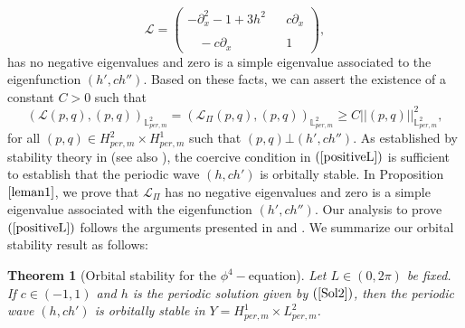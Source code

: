 \documentclass[12pt,reqno,a4paper]{amsart} %
\numberwithin{equation}{section}
\numberwithin{figure}{section}
\newtheorem{theorem}{Theorem}[section]
\begin{document}
	\begin{equation}\label{matrixop313}
		\displaystyle \mathcal{L}=\left(
		\begin{array}{ccc}
		-\partial_x^2-1+3h^2 & &c\partial_x\\\\
		\ \ \ \ -c\partial_x & & 1
		\end{array}\right),
	\end{equation}
	has no negative eigenvalues and zero is a simple eigenvalue associated to the eigenfunction $(h',ch'')$. Based on these facts, we can assert the existence of a constant $C>0$ such that
\begin{equation}\label{positiveL}
(\mathcal{L}(p,q),(p,q))_{\mathbb{L}_{per,m}^2}=(\mathcal{L}_{\Pi}(p,q),(p,q))_{\mathbb{L}_{per,m}^2}\geq C||(p,q)||_{\mathbb{L}_{per,m}^2}^2,
\end{equation}
for all $(p,q)\in H_{per,m}^2\times H_{per,m}^1$ such that $(p,q)\bot (h',ch'')$. As established by stability theory in \cite[Section 4]{Natali2015} (see also \cite{grillakis1}), the coercive condition in $(\ref{positiveL})$ is sufficient to establish that the periodic wave $(h,ch')$ is orbitally stable. In Proposition $\ref{leman1}$, we prove that $\mathcal{L}_{\Pi}$ has no negative eigenvalues and zero is a simple eigenvalue associated with the eigenfunction $(h',ch'')$. Our analysis to prove $(\ref{positiveL})$ follows the arguments presented in \cite[Theorem 5.3.2]{kapitula} and \cite[Theorem 4.1]{pel-book}. We summarize our orbital stability result as follows:

\begin{theorem}[Orbital stability for the $\phi^4-$equation]
	Let $L\in (0,2\pi)$ be fixed. If $c \in (-1,1)$ and $h$ is the periodic solution given by $(\ref{Sol2})$, then the periodic wave $(h,ch')$ is orbitally stable in $Y=H_{per,m}^1\times L_{per,m}^2$.
	\label{stabthm}\end{theorem}
\end{document}
